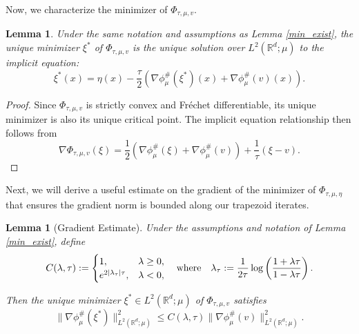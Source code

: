 \documentclass[11pt,a4paper]{amsart}
\newcommand{\1}{\mathds{1}}
\newcommand{\R}{{\mathbb R}}
\newtheorem{lemma}[theorem]{\textbf{Lemma}}
\numberwithin{equation}{section}
\begin{document}
Now, we characterize the minimizer of $\Phi_{\tau,\mu, v}$.

\begin{lemma}  \label{critical_points}
Under the same notation and assumptions as Lemma \ref{min_exist}, the unique minimizer $\xi^*$ of $\Phi_{\tau,\mu,v}$ is the unique solution over $L^2(\R^d;\mu)$ to the implicit equation:
\[
\xi^*(x) = \eta(x) - \frac{\tau}{2} \left( \nabla \phi^{\#}_{\mu}(\xi^*)(x) + \nabla \phi^{\#}_{\mu}(v)(x)  \right).
\] 
\end{lemma}

\begin{proof} 
Since $\Phi_{\tau,\mu,v}$ is strictly convex and Fréchet differentiable, its unique minimizer is also its unique critical point. The implicit equation relationship then follows from
\[
\nabla \Phi_{\tau,\mu,v}(\xi) = \frac{1}{2} \left( \nabla \phi^{\#}_{\mu}(\xi)  + \nabla \phi^{\#}_{\mu}(v)  \right) + \frac{1}{\tau} (\xi - v).
\]
\end{proof}

Next, we will derive a useful estimate on the gradient of the minimizer of $\Phi_{\tau,\mu,\eta}$ that ensures the gradient norm is bounded along our trapezoid iterates.

\begin{lemma}[Gradient Estimate]  \label{gradient_along_flow}
Under the assumptions and notation of Lemma \ref{min_exist}, define
\[
C(\lambda,\tau) :=
\begin{cases}
1, & \lambda \geq 0, \\
e^{2|\lambda_{\tau}| \tau}, & \lambda < 0,
\end{cases}
\quad \textnormal{where} \quad 
\lambda_{\tau} := \frac{1}{2\tau} \log \left( \frac{1+\lambda \tau}{1-\lambda \tau} \right).
\]

\noindent Then the unique minimizer $\xi^* \in L^2(\mathbb{R}^d;\mu)$ of $\Phi_{\tau,\mu,v}$ satisfies
\[
\|\nabla \phi^{\#}_{\mu}(\xi^*) \|^2_{L^2(\mathbb{R}^d;\mu)} \leq C(\lambda,\tau) \|\nabla \phi^{\#}_{\mu}(v) \|^2_{L^2(\mathbb{R}^d;\mu)}.
\]
\end{lemma}
\end{document}
